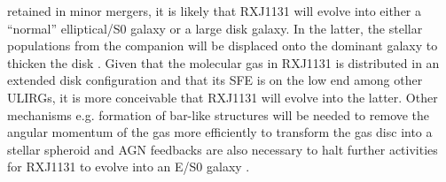 \documentclass[]{emulateapj}
\begin{document}
retained in minor mergers,
it is likely that RXJ1131 will evolve into either a 
``normal'' elliptical/S0 galaxy or a large disk galaxy.  
In the latter, the stellar populations from the companion will be displaced onto the 
dominant galaxy to thicken the disk \citep[\eg][]{Lotz08a, Robertson06a}.
Given that the molecular gas in 
RXJ1131 is distributed in an extended disk configuration and that its 
SFE is on the low end among other ULIRGs,  %
it is more conceivable that RXJ1131 will evolve into the
latter.
Other mechanisms e.g. formation of bar-like structures will be needed to remove the
angular momentum of the gas more efficiently to transform the gas disc into a stellar spheroid and
AGN feedbacks are also necessary to halt further activities for RXJ1131 to evolve into an 
E/S0 galaxy \citep{Lotz08a}.
\end{document}
